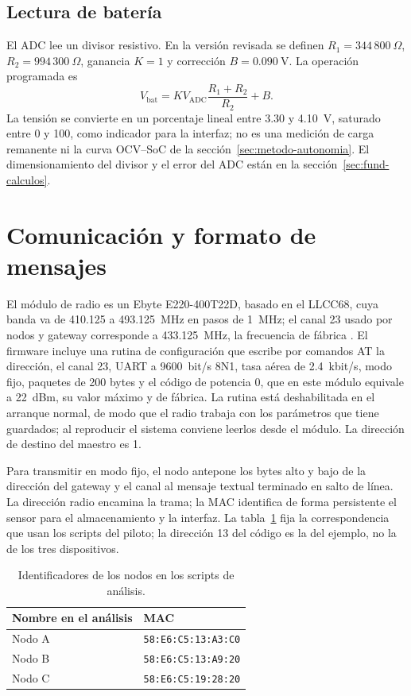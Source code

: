 \subsection{Lectura de batería}
El ADC lee un divisor resistivo. En la versión revisada se definen $R_1=344\,800~\Omega$, $R_2=994\,300~\Omega$, ganancia $K=1$ y corrección $B=\SI{0.090}{\volt}$. La operación programada es
\begin{equation}
V_{\mathrm{bat}}=K V_{\mathrm{ADC}}\frac{R_1+R_2}{R_2}+B.
\label{eq:impl-bateria}
\end{equation}
La tensión se convierte en un porcentaje lineal entre 3.30 y \SI{4.10}{\volt}, saturado entre 0 y 100, como indicador para la interfaz; no es una medición de carga remanente ni la curva OCV--SoC de la sección~\ref{sec:metodo-autonomia}. El dimensionamiento del divisor y el error del ADC están en la sección~\ref{sec:fund-calculos}.

\section{Comunicación y formato de mensajes}
\label{sec:impl-comunicacion}
El módulo de radio es un Ebyte E220-400T22D, basado en el LLCC68, cuya banda va de 410.125 a 493.125~MHz en pasos de 1~MHz; el canal 23 usado por nodos y gateway corresponde a 433.125~MHz, la frecuencia de fábrica \citep{e220manual}. El firmware incluye una rutina de configuración que escribe por comandos AT la dirección, el canal 23, UART a 9600~bit/s 8N1, tasa aérea de 2.4~kbit/s, modo fijo, paquetes de 200 bytes y el código de potencia 0, que en este módulo equivale a 22~dBm, su valor máximo y de fábrica. La rutina está deshabilitada en el arranque normal, de modo que el radio trabaja con los parámetros que tiene guardados; al reproducir el sistema conviene leerlos desde el módulo. La dirección de destino del maestro es 1.

Para transmitir en modo fijo, el nodo antepone los bytes alto y bajo de la dirección del gateway y el canal al mensaje textual terminado en salto de línea. La dirección radio encamina la trama; la MAC identifica de forma persistente el sensor para el almacenamiento y la interfaz. La tabla~\ref{tab:impl-identidad-nodos} fija la correspondencia que usan los scripts del piloto; la dirección 13 del código es la del ejemplo, no la de los tres dispositivos.

\begin{table}[htbp]
\centering
\caption{Identificadores de los nodos en los scripts de análisis.}
\label{tab:impl-identidad-nodos}
\begin{tabular}{ll}
\toprule
\textbf{Nombre en el análisis} & \textbf{MAC} \\
\midrule
Nodo A & \texttt{58:E6:C5:13:A3:C0} \\
Nodo B & \texttt{58:E6:C5:13:A9:20} \\
Nodo C & \texttt{58:E6:C5:19:28:20} \\
\bottomrule
\end{tabular}
\end{table}

